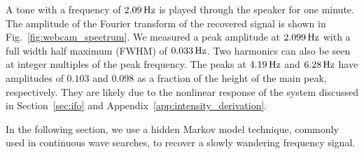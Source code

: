 \documentclass[paper-main.tex]{subfiles}
\begin{document}
A tone with a frequency of $2.09\,{\rm Hz}$ is played through the speaker for one minute. 
The amplitude of the Fourier transform of the recovered signal is shown in Fig.~\ref{fig:webcam_spectrum}. 
We measured a peak amplitude at $2.099\,{\rm Hz}$ with a full width half maximum (FWHM) of $0.033\,{\rm Hz}$. 
Two harmonics can also be seen at integer multiples of the peak frequency. 
The peaks at $4.19\,{\rm Hz}$ and $6.28\,{\rm Hz}$ have amplitudes of $0.103$ and $0.098$ as a fraction of the height of the main peak, respectively. They are likely due to the nonlinear response of the system discussed in Section~\ref{sec:ifo} and Appendix~\ref{app:intensity_derivation}.


In the following section, we use a hidden Markov model technique, commonly used in continuous wave searches, to recover a slowly wandering frequency signal.
\end{document}
